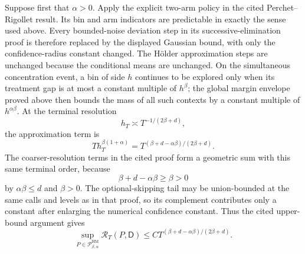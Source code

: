 Suppose first that \(\alpha>0\).  Apply the explicit two-arm policy in the cited Perchet--Rigollet result.  Its bin and arm indicators are predictable in exactly the sense used above.  Every bounded-noise deviation step in its successive-elimination proof is therefore replaced by the displayed Gaussian bound, with only the confidence-radius constant changed.  The H\"older approximation steps are unchanged because the conditional means are unchanged.  On the simultaneous concentration event, a bin of side \(h\) continues to be explored only when its treatment gap is at most a constant multiple of \(h^\beta\); the global margin envelope proved above then bounds the mass of all such contexts by a constant multiple of \(h^{\alpha\beta}\).  At the terminal resolution
\[
 h_T\asymp T^{-1/(2\beta+d)},
\]
the approximation term is
\[
 T h_T^{\beta(1+\alpha)}
 =T^{(\beta+d-\alpha\beta)/(2\beta+d)}.
\]
The coarser-resolution terms in the cited proof form a geometric sum with this same terminal order, because
\[
 \beta+d-\alpha\beta\geq\beta>0
\]
by \(\alpha\beta\leq d\) and \(\beta>0\).  The optional-skipping tail may be union-bounded at the same calls and levels as in that proof, so its complement contributes only a constant after enlarging the numerical confidence constant.  Thus the cited upper-bound argument gives
\[
 \sup_{P\in\mathcal P_{\beta,\alpha}^{\mathrm{HM}}}
 \mathcal R_T(P,\mathsf D)
 \leq C T^{(\beta+d-\alpha\beta)/(2\beta+d)}.
\]

